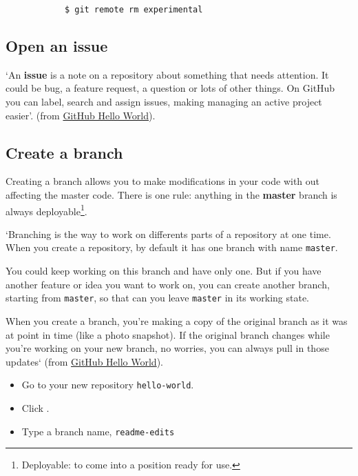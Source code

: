 \documentclass[12pt]{article}
\begin{document}
			\begin{verbatim}
			$ git remote rm experimental
			\end{verbatim}
		

	\subsection{Open an issue}

		`An \textbf{issue} is a note on a repository about something that needs attention. It could be bug, a feature request, a question or lots of other things. On GitHub you can label, search and assign issues, making managing an active project easier'. (from \href{https://guides.github.com/activities/hello-world/}{GitHub Hello World}). 



	\subsection{Create a branch}

		Creating a branch allows you to make modifications in your code with out affecting the master code. There is one rule: anything in the \textbf{master} branch is always deployable\footnote{Deployable: to come into a position ready for use.}. 

		`Branching is the way to work on differents parts of a repository at one time. When you create a repository, by default it has one branch with name \verb|master|. 

		You could keep working on this branch and have only one. But if you have another feature or idea you want to work on, you can create another branch, starting from \verb|master|, so that can you leave \verb|master| in its working state.


		When you create a branch, you're making a copy of the original branch as it was at point in time (like a photo snapshot). If the original branch changes while you're working on your new branch, no worries, you can always pull in those updates` (from \href{https://guides.github.com/activities/hello-world/}{GitHub Hello World}). 


		\begin{itemize}
		\item Go to your new repository \verb|hello-world|.
		\item Click .
		\item Type a branch name, \verb|readme-edits|		
		\end{itemize}
\end{document}
